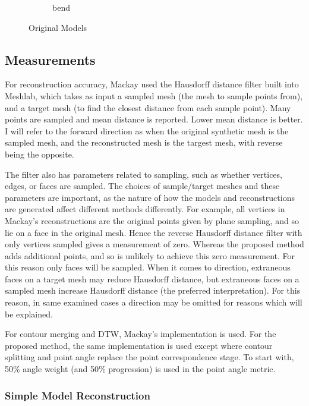\documentclass[11p, titlepage]{article}
\begin{document}
\begin{figure}[h!]
\begin{subfigure}[b]{0.3\textwidth}
         \caption{bend}
         \label{fig:bend}
     \end{subfigure}
        \caption{Original Models}
        \label{fig:original_models}
\end{figure}

\subsection{Measurements}

For reconstruction accuracy, Mackay used the Hausdorff distance filter built into Meshlab, which takes as input a sampled mesh (the mesh to sample points from), and a target mesh (to find the closest distance from each sample point). Many points are sampled and mean distance is reported. Lower mean distance is better. I will refer to the forward direction as when the original synthetic mesh is the sampled mesh, and the reconstructed mesh is the targest mesh, with reverse being the opposite. 

The filter also has parameters related to sampling, such as whether vertices, edges, or faces are sampled. The choices of sample/target meshes and these parameters are important, as the nature of how the models and reconstructions are generated affect different methods differently. For example, all vertices in Mackay's reconstructions are the original points given by plane sampling, and so lie on a face in the original mesh. Hence the reverse Hausdorff distance filter with only vertices sampled gives a measurement of zero. Whereas the proposed method adds additional points, and so is unlikely to achieve this zero measurement. For this reason only faces will be sampled. When it comes to direction, extraneous faces on a target mesh may reduce Hausdorff distance, but extraneous faces on a sampled mesh increase Hausdorff distance (the preferred interpretation). For this reason, in same examined cases a direction may be omitted for reasons which will be explained.

For contour merging and DTW, Mackay's implementation is used. For the proposed method, the same implementation is used except where contour splitting and point angle replace the point correspondence stage. To start with, 50\% angle weight (and 50\% progression) is used in the point angle metric.
\pagebreak

\subsubsection{Simple Model Reconstruction}
\end{document}
